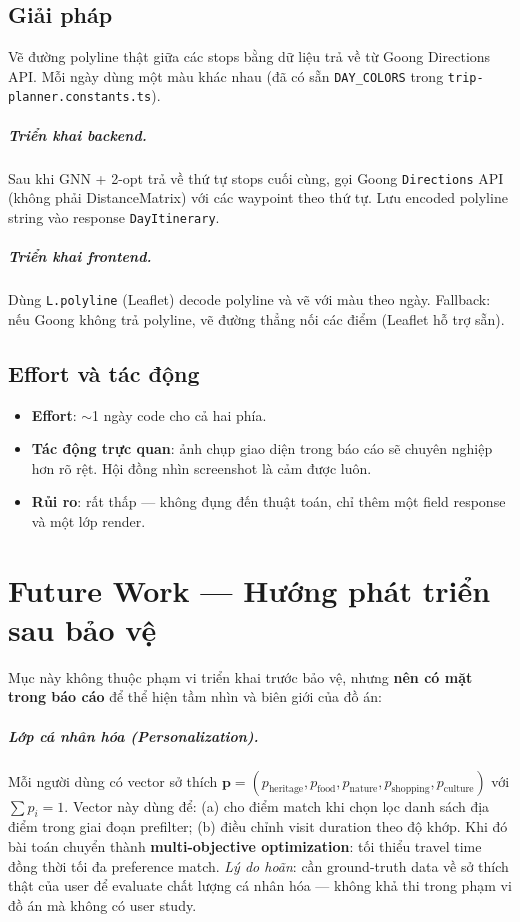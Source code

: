 \documentclass[12pt,a4paper]{report}
\begin{document}
\section{Giải pháp}

Vẽ đường polyline thật giữa các stops bằng dữ liệu trả về từ Goong Directions API. Mỗi ngày dùng một màu khác nhau (đã có sẵn \texttt{DAY\_COLORS} trong \texttt{trip-planner.constants.ts}).

\paragraph{Triển khai backend.} Sau khi GNN + 2-opt trả về thứ tự stops cuối cùng, gọi Goong \texttt{Directions} API (không phải DistanceMatrix) với các waypoint theo thứ tự. Lưu encoded polyline string vào response \texttt{DayItinerary}.

\paragraph{Triển khai frontend.} Dùng \texttt{L.polyline} (Leaflet) decode polyline và vẽ với màu theo ngày. Fallback: nếu Goong không trả polyline, vẽ đường thẳng nối các điểm (Leaflet hỗ trợ sẵn).

\section{Effort và tác động}

\begin{itemize}[leftmargin=*]
    \item \textbf{Effort}: $\sim$1 ngày code cho cả hai phía.
    \item \textbf{Tác động trực quan}: ảnh chụp giao diện trong báo cáo sẽ chuyên nghiệp hơn rõ rệt. Hội đồng nhìn screenshot là cảm được luôn.
    \item \textbf{Rủi ro}: rất thấp --- không đụng đến thuật toán, chỉ thêm một field response và một lớp render.
\end{itemize}

\chapter{Future Work --- Hướng phát triển sau bảo vệ}

Mục này không thuộc phạm vi triển khai trước bảo vệ, nhưng \textbf{nên có mặt trong báo cáo} để thể hiện tầm nhìn và biên giới của đồ án:

\paragraph{Lớp cá nhân hóa (Personalization).} Mỗi người dùng có vector sở thích $\mathbf{p} = (p_\text{heritage}, p_\text{food}, p_\text{nature}, p_\text{shopping}, p_\text{culture})$ với $\sum p_i = 1$. Vector này dùng để: (a) cho điểm match khi chọn lọc danh sách địa điểm trong giai đoạn prefilter; (b) điều chỉnh visit duration theo độ khớp. Khi đó bài toán chuyển thành \textbf{multi-objective optimization}: tối thiểu travel time đồng thời tối đa preference match. \textit{Lý do hoãn}: cần ground-truth data về sở thích thật của user để evaluate chất lượng cá nhân hóa --- không khả thi trong phạm vi đồ án mà không có user study.
\end{document}
